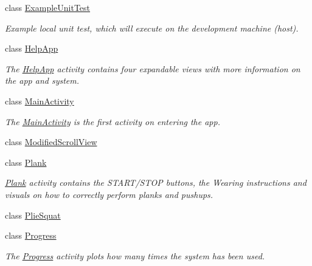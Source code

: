 \begin{DoxyCompactItemize}
class \mbox{\hyperlink{classcom_1_1example_1_1trainawearapplication_1_1_example_unit_test}{Example\+Unit\+Test}}
\begin{DoxyCompactList}\small\item\em Example local unit test, which will execute on the development machine (host). \end{DoxyCompactList}\item 
class \mbox{\hyperlink{classcom_1_1example_1_1trainawearapplication_1_1_help_app}{Help\+App}}
\begin{DoxyCompactList}\small\item\em The \mbox{\hyperlink{classcom_1_1example_1_1trainawearapplication_1_1_help_app}{Help\+App}} activity contains four expandable views with more information on the app and system. \end{DoxyCompactList}\item 
class \mbox{\hyperlink{classcom_1_1example_1_1trainawearapplication_1_1_main_activity}{Main\+Activity}}
\begin{DoxyCompactList}\small\item\em The \mbox{\hyperlink{classcom_1_1example_1_1trainawearapplication_1_1_main_activity}{Main\+Activity}} is the first activity on entering the app. \end{DoxyCompactList}\item 
class \mbox{\hyperlink{classcom_1_1example_1_1trainawearapplication_1_1_modified_scroll_view}{Modified\+Scroll\+View}}
\item 
class \mbox{\hyperlink{classcom_1_1example_1_1trainawearapplication_1_1_plank}{Plank}}
\begin{DoxyCompactList}\small\item\em \mbox{\hyperlink{classcom_1_1example_1_1trainawearapplication_1_1_plank}{Plank}} activity contains the S\+T\+A\+R\+T/\+S\+T\+OP buttons, the Wearing instructions and visuals on how to correctly perform planks and pushups. \end{DoxyCompactList}\item 
class \mbox{\hyperlink{classcom_1_1example_1_1trainawearapplication_1_1_plie_squat}{Plie\+Squat}}
\item 
class \mbox{\hyperlink{classcom_1_1example_1_1trainawearapplication_1_1_progress}{Progress}}
\begin{DoxyCompactList}\small\item\em The \mbox{\hyperlink{classcom_1_1example_1_1trainawearapplication_1_1_progress}{Progress}} activity plots how many times the system has been used. \end{DoxyCompactList}\item 

\end{DoxyCompactItemize}
